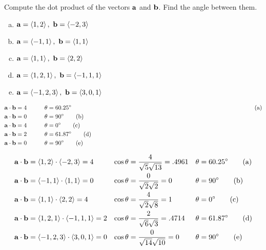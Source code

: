 \begin{question}
Compute the dot product of the vectors $\mathbf{a}$ and $\mathbf{b}$.
Find the angle between them.
\begin{enumerate}[(a)]
\item $\mathbf{a}=\left< 1,2\right> ,\ \mathbf{b}=\left< -2,3\right> $
\item $\mathbf{a}=\left< -1,1\right> ,\ \mathbf{b}=\left< 1,1\right> $
\item $\mathbf{a}=\left< 1,1\right> ,\ \mathbf{b}=\left< 2,2\right> $
\item $\mathbf{a}=\left< 1,2,1\right> ,\ \mathbf{b}=\left< -1,1,1\right> $
\item $\mathbf{a}=\left< -1,2,3\right> ,\ \mathbf{b}=\left< 3,0,1\right> $
\end{enumerate}
\end{question}


\begin{answer}
\leqnomode
\begin{alignat*}{3}
\va\cdot\vb&=4\qquad &
\theta &= 60.25^\circ\hskip4in 
\tag{a}\\
\va\cdot\vb&=0 &
\theta &= 90^\circ 
\tag{b}\\
\va\cdot\vb&=4 &
\theta &= 0^\circ 
\tag{c}\\
\va\cdot\vb&=2 &
\theta &= 61.87^\circ 
\tag{d}\\
\va\cdot\vb&=0 &
\theta &= 90^\circ 
\tag{e}
\end{alignat*}
\reqnomode
\end{answer}

\begin{solution}
\leqnomode
\begin{align*}
\mathbf{a}\cdot\mathbf{b}&=\left< 1,2\right>\cdot\left< -2,3\right>=4 &
\cos\theta&=\frac{4}{\sqrt{5}\sqrt{13}}=.4961 &
\theta &= 60.25^\circ 
\tag{a}\\
\mathbf{a}\cdot\mathbf{b}&=\left< -1,1\right>\cdot\left< 1,1\right>=0 &
\cos\theta&=\frac{0}{\sqrt{2}\sqrt{2}}=0 &
\theta &= 90^\circ 
\tag{b}\\
\mathbf{a}\cdot\mathbf{b}&=\left< 1,1\right>\cdot\left< 2,2\right>=4 &
\cos\theta&=\frac{4}{\sqrt{2}\sqrt{8}}=1 &
\theta &= 0^\circ 
\tag{c}\\
\mathbf{a}\cdot\mathbf{b}&=\left< 1,2,1\right>\cdot\left< -1,1,1\right>=2 &
\cos\theta&=\frac{2}{\sqrt{6}\sqrt{3}}=.4714 &
\theta &= 61.87^\circ 
\tag{d}\\
\mathbf{a}\cdot\mathbf{b}&=\left< -1,2,3\right>\cdot\left< 3,0,1\right>=0 &
\cos\theta&=\frac{0}{\sqrt{14}\sqrt{10}}=0 &
\theta &= 90^\circ 
\tag{e}
\end{align*}
\reqnomode
\end{solution}

